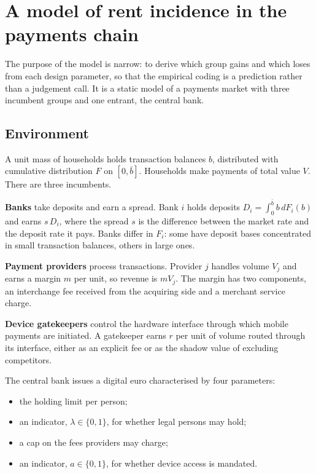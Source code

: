 \documentclass[11pt]{article}
\theoremstyle{plain}\newtheorem{proposition}{Proposition}
\begin{document}
\section{A model of rent incidence in the payments chain}\label{sec:model}

The purpose of the model is narrow: to derive which group gains and which loses from each design parameter, so that the empirical coding is a prediction rather than a judgement call. It is a static model of a payments market with three incumbent groups and one entrant, the central bank.

\subsection{Environment}

A unit mass of households holds transaction balances $b$, distributed with cumulative distribution $F$ on $[0,\bar b]$. Households make payments of total value $V$. There are three incumbents.

\textbf{Banks} take deposits and earn a spread. Bank $i$ holds deposits $D_i = \int_0^{\bar b} b \, dF_i(b)$ and earns $s\,D_i$, where the spread $s$ is the difference between the market rate and the deposit rate it pays. Banks differ in $F_i$: some have deposit bases concentrated in small transaction balances, others in large ones.

\textbf{Payment providers} process transactions. Provider $j$ handles volume $V_j$ and earns a margin $m$ per unit, so revenue is $m V_j$. The margin has two components, an interchange fee received from the acquiring side and a merchant service charge.

\textbf{Device gatekeepers} control the hardware interface through which mobile payments are initiated. A gatekeeper earns $r$ per unit of volume routed through its interface, either as an explicit fee or as the shadow value of excluding competitors.

The central bank issues a digital euro characterised by four parameters:
\begin{itemize}[leftmargin=2.2em,labelwidth=1.4em,align=left,itemsep=1pt]
\item[$L$] the holding limit per person;
\item[$\lambda$] an indicator, $\lambda\in\{0,1\}$, for whether legal persons may hold;
\item[$\bar f$] a cap on the fees providers may charge;
\item[$a$] an indicator, $a\in\{0,1\}$, for whether device access is mandated.
\end{itemize}
\end{document}
